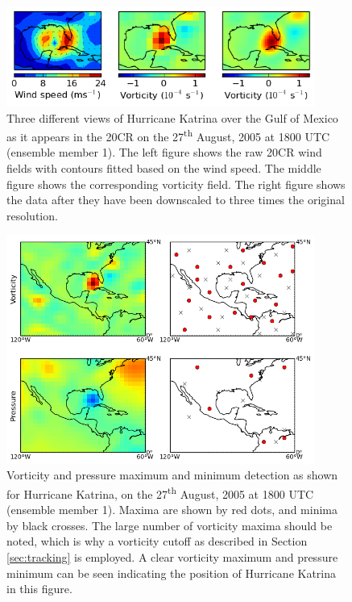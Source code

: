\documentclass[pdftex,12pt,a4paper]{report}
\newcommand{\ts}{\textsuperscript}
\begin{document}
\begin{figure}[hb!]
    \centering
    \includegraphics[width=0.9\textwidth]{figures/katrina_data_proc}
    \caption{Three different views of Hurricane Katrina over the Gulf of Mexico as it appears in the
        20CR on the 27\ts{th} August, 2005 at 1800 UTC (ensemble member 1). The left
        figure shows the raw 20CR wind fields with contours fitted based on the wind speed. The
        middle figure shows the corresponding vorticity field. The right figure shows the data after
        they have been downscaled to three times the original resolution.}
    \label{fig:katrina_data_proc}
\end{figure}

\begin{figure}[hb!]
    \centering
    \includegraphics[width=0.9\textwidth]{figures/katrina_max_mins}
    \caption{Vorticity and pressure maximum and minimum detection as shown for Hurricane Katrina,
        on the 27\ts{th} August, 2005 at 1800 UTC (ensemble member 1). Maxima are shown
        by red dots, and minima by black crosses. The large number of vorticity maxima should be
        noted, which is why a vorticity cutoff as described in Section \ref{sec:tracking} is
        employed. A clear vorticity maximum and pressure minimum can be seen indicating the position
        of Hurricane Katrina in this figure.}
    \label{fig:katrina_max_mins}
\end{figure}
\end{document}
